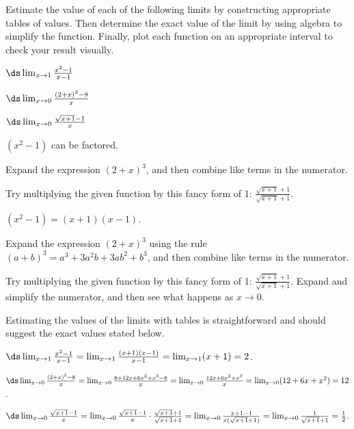 \begin{activity} \label{A:1.2.1}  Estimate the value of each of the following limits by constructing appropriate tables of values.  Then determine the exact value of the limit by using algebra to simplify the function. Finally, plot each function on an appropriate interval to check your result visually.
\ba
		\item $\ds \lim_{x \to 1} \frac{x^2 - 1}{x-1}$
		\item $\ds \lim_{x \to 0} \frac{(2+x)^3 - 8}{x}$
		\item $\ds \lim_{x \to 0} \frac{\sqrt{x+1} - 1}{x}$
\ea
\end{activity}
\begin{smallhint}
\ba
	\item $(x^2 - 1)$ can be factored.
	\item Expand the expression $(2+x)^3$, and then combine like terms in the numerator.
	\item Try multiplying the given function by this fancy form of 1: $\frac{\sqrt{x+1} + 1}{\sqrt{x+1} + 1}$.
\ea
\end{smallhint}
\begin{bighint}
\ba
	\item $(x^2 - 1) = (x+1)(x-1)$.
	\item Expand the expression $(2+x)^3$ using the rule $(a+b)^3 = a^3 + 3a^2b + 3ab^2 + b^3$, and then combine like terms in the numerator.
	\item Try multiplying the given function by this fancy form of 1: $\frac{\sqrt{x+1} + 1}{\sqrt{x+1} + 1}$.  Expand and simplify the numerator, and then see what happens as $x \to 0$.
\ea
\end{bighint}
\begin{activitySolution}
Estimating the values of the limits with tables is straightforward and should suggest the exact values stated below.
\ba
	\item $\ds \lim_{x \to 1} \frac{x^2 - 1}{x-1} = \lim_{x \to 1} \frac{(x+1)(x-1)}{x-1} = \lim_{x \to 1} (x+1) = 2$. 
	\item $\ds \lim_{x \to 0} \frac{(2+x)^3 - 8}{x} = \lim_{x \to 0} \frac{8 + 12x + 6x^2 + x^3 - 8}{x} = \lim_{x \to 0} \frac{12x + 6x^2 + x^3}{x} =  \lim_{x \to 0} (12 + 6x + x^2) = 12$.
	\item $\ds \lim_{x \to 0} \frac{\sqrt{x+1} - 1}{x} = \lim_{x \to 0} \frac{\sqrt{x+1} - 1}{x} \cdot \frac{\sqrt{x+1} + 1}{\sqrt{x+1} + 1} = \lim_{x \to 0} \frac{x+1-1}{x(\sqrt{x+1}+1)} = \lim_{x \to 0} \frac{1}{\sqrt{x+1}+1} = \frac{1}{2}.$
\ea
\end{activitySolution}
\aftera
